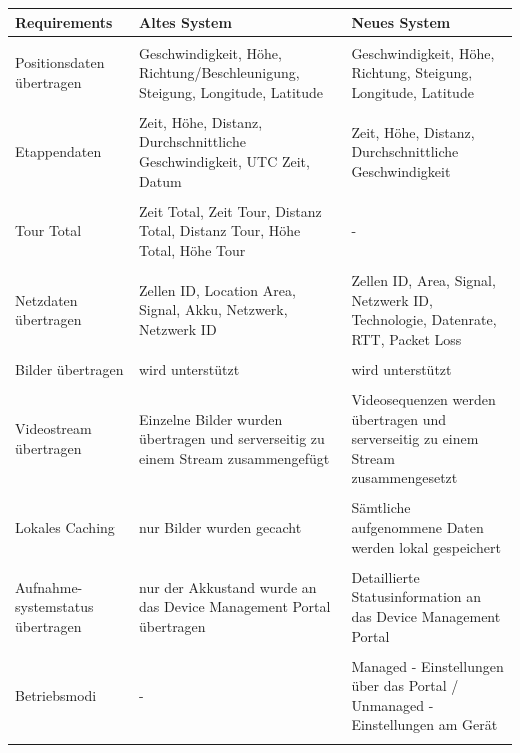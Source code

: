 \begin{longtable}{  p{3.5cm} | p{4.3cm} | p{4.3cm} }
    
    \textbf{Requirements} & \textbf{Altes System} & \textbf{Neues System} \\ [1ex] \hline \hline & &  \\ [-1.5ex]
    Positionsdaten übertragen & Geschwindigkeit, H\"{o}he, Richtung/Beschleunigung, Steigung, Longitude, Latitude & Geschwindigkeit, H\"{o}he, Richtung, Steigung, Longitude, Latitude \\ [1ex] \hline & &  \\ [-1.5ex]
    Etappendaten & Zeit, Höhe, Distanz, Durchschnittliche Geschwindigkeit, UTC Zeit, Datum & Zeit, Höhe, Distanz, Durchschnittliche Geschwindigkeit \\ [1ex] \hline & &  \\ [-1.5ex]
     Tour Total & Zeit Total, Zeit Tour, Distanz Total, Distanz Tour, Höhe Total, H\"{o}he Tour & - \\ [1ex] \hline & &  \\ [-1.5ex]
    Netzdaten übertragen & Zellen ID, Location Area, Signal, Akku, Netzwerk, Netzwerk ID & Zellen ID, Area, Signal, Netzwerk ID, Technologie, Datenrate, RTT, Packet Loss\\ [1ex] \hline & &  \\ [-1.5ex]
    Bilder \"{u}bertragen & wird unterstützt & wird unterstützt \\ [1ex] \hline & &  \\ [-1.5ex]
    Videostream \"{u}bertragen & Einzelne Bilder wurden \"{u}bertragen und serverseitig zu einem Stream zusammengef\"{u}gt & Videosequenzen werden \"{u}bertragen und serverseitig zu einem Stream zusammengesetzt\\ [1ex] \hline & &  \\ [-1.5ex]
    Lokales Caching & nur Bilder wurden gecacht & S\"{a}mtliche aufgenommene Daten werden lokal gespeichert\\ [1ex] \hline & &  \\ [-1.5ex]
	Aufnahme- systemstatus \"{u}bertragen & nur der Akkustand wurde an das Device Management Portal \"{u}bertragen & Detaillierte Statusinformation an das Device Management Portal\\ [1ex] \hline & &  \\ [-1.5ex]   
    Betriebsmodi & - & Managed - Einstellungen \"{u}ber das Portal / Unmanaged - Einstellungen am Ger\"{a}t\\ [1ex] \hline & &  \\ [-1.5ex]

\end{longtable}

